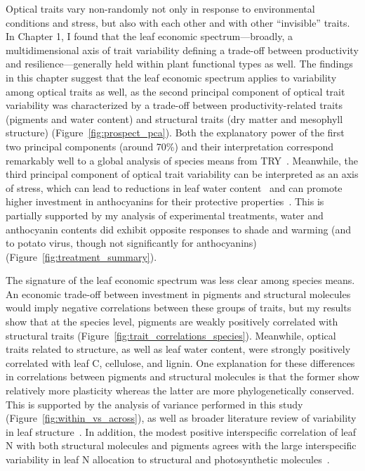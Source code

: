 Optical traits vary non-randomly not only in response to environmental conditions and stress, but also with each other and with other ``invisible'' traits.
In Chapter 1, I found that the leaf economic spectrum---broadly, a multidimensional axis of trait variability defining a trade-off between productivity and resilience---generally held within plant functional types as well.
The findings in this chapter suggest that the leaf economic spectrum applies to variability among optical traits as well, as the second principal component of optical trait variability was characterized by a trade-off between productivity-related traits (pigments and water content) and structural traits (dry matter and mesophyll structure) (Figure~\ref{fig:prospect_pca}).
Both the explanatory power of the first two principal components (around 70\%) and their interpretation correspond remarkably well to a global analysis of species means from TRY~\cite{diaz_global_2016}.
Meanwhile, the third principal component of optical trait variability can be interpreted as an axis of stress, which can lead to reductions in leaf water content~\cite{penuelas_1994_reflectance,kramer_1995_water,cheng_2011_spectroscopic} and can promote higher investment in anthocyanins for their protective properties~\cite{gould_2004_nature}.
This is partially supported by my analysis of experimental treatments, water and anthocyanin contents did exhibit opposite responses to shade and warming (and to potato virus, though not significantly for anthocyanins) (Figure~\ref{fig:treatment_summary}).

The signature of the leaf economic spectrum was less clear among species means.
An economic trade-off between investment in pigments and structural molecules would imply negative correlations between these groups of traits,
but my results show that at the species level, pigments are weakly positively correlated with structural traits (Figure~\ref{fig:trait_correlations_species}).
Meanwhile, optical traits related to structure, as well as leaf water content, were strongly positively correlated with leaf C, cellulose, and lignin.
One explanation for these differences in correlations between pigments and structural molecules is that the former show relatively more plasticity whereas the latter are more phylogenetically conserved.
This is supported by the analysis of variance performed in this study (Figure~\ref{fig:within_vs_across}), as well as broader literature review of variability in leaf structure~\cite{poorter_2009_causes,onoda_physiological_2017}.
In addition, the modest positive interspecific correlation of leaf N with both structural molecules and pigments agrees with the large interspecific variability in leaf N allocation to structural and photosynthetic molecules~\cite{onoda_physiological_2017}.

